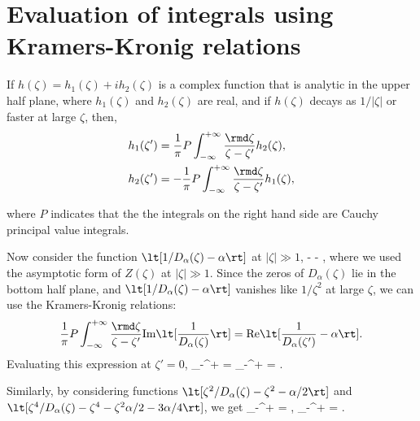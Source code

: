 
\chapter{Evaluation of integrals using Kramers-Kronig relations}
\label{app:KKrel}

If $h(\zeta) = h_1(\zeta) + i h_2(\zeta)$ is a complex function that is analytic in the
upper half plane, where $h_1(\zeta)$ and $h_2(\zeta)$ are real, and if $h(\zeta)$ decays
as $1/|\zeta|$ or faster at large $\zeta$, then,
\begin{align}
& h_1(\zeta') = \frac{1}{\pi} P \int_{-\infty}^{+\infty} \frac{\rmd\zeta}{\zeta-\zeta'}
h_2(\zeta), \\
& h_2(\zeta') = -\frac{1}{\pi} P \int_{-\infty}^{+\infty} \frac{\rmd\zeta}{\zeta-\zeta'}
h_1(\zeta), 
\end{align}

where $P$ indicates that the the integrals on the right hand side are Cauchy principal
value integrals.

Now consider the function $\lt[1/D_\alpha(\zeta) - \alpha\rt]$ at $|\zeta| \gg 1$,
\beq
{} - \alpha \approx {} - \alpha \approx {}, 
\eeq
where we used the asymptotic form of $Z(\zeta)$ at $|\zeta| \gg 1$. Since the zeros of
$D_\alpha(\zeta)$ lie in the bottom half plane, and $\lt[1/D_\alpha(\zeta) - \alpha\rt]$
vanishes like $1/\zeta^2$ at large $\zeta$, we can use the Kramers-Kronig relations:
\begin{align}
\frac{1}{\pi} P \int_{-\infty}^{+\infty} \frac{\rmd \zeta}{\zeta - \zeta'}
\text{Im}\lt[\frac{1}{D_\alpha(\zeta)}\rt] &= \text{Re}\lt[\frac{1}{D_\alpha(\zeta')} -
\alpha\rt]. \\
\end{align}
Evaluating this expression at $\zeta' = 0$, 
\beq
{} \int_{-\infty}^{+\infty} \frac{\rmd\zeta}{\zeta}  =  \int_{-\infty}^{+\infty}
\rmd\zeta {} = .
\eeq

Similarly, by considering functions $\lt[\zeta^2/D_\alpha(\zeta) - \zeta^2 - \alpha/2\rt]$ and
$\lt[\zeta^4/D_\alpha(\zeta) - \zeta^4 -\zeta^2 \alpha/2 - 3 \alpha/4\rt]$, we get
\beq
{}\int_{-\infty}^{+\infty} \rmd\zeta {} = , 
\eeq
\beq
{}\int_{-\infty}^{+\infty} \rmd\zeta {} = .
\eeq
